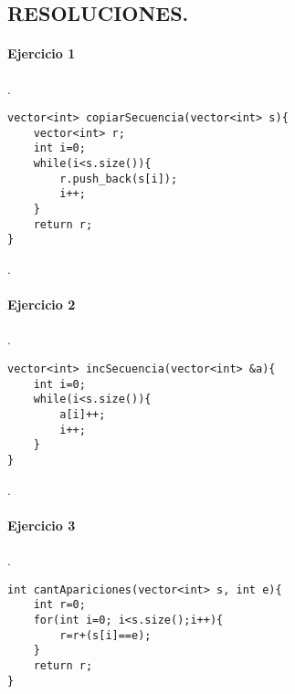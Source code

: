 \documentclass{article}
\begin{document}
\renewcommand{\thelstlisting}{\thesection.\arabic{lstlisting}}



\begin{center}
\section*{RESOLUCIONES.}
\end{center}
\paragraph{Ejercicio 1}.

\begin{lstlisting}
vector<int> copiarSecuencia(vector<int> s){
	vector<int> r;
	int i=0;
	while(i<s.size()){
		r.push_back(s[i]);
		i++;	
	}
	return r;
}
\end{lstlisting}
.
\paragraph*{Ejercicio 2}.

\begin{lstlisting}
vector<int> incSecuencia(vector<int> &a){
	int i=0;
	while(i<s.size()){
		a[i]++;
		i++;	
	}
}
\end{lstlisting}
.
\paragraph*{Ejercicio 3}.

\begin{lstlisting}
int cantApariciones(vector<int> s, int e){
	int r=0;
	for(int i=0; i<s.size();i++){
		r=r+(s[i]==e);
	}
	return r;
}
\end{lstlisting}
\end{document}
